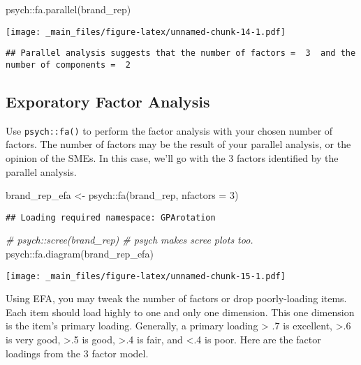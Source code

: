 \documentclass[
]{book}
\newenvironment{Shaded}{\begin{snugshade}}{\end{snugshade}}
\newcommand{\AttributeTok}[1]{\textcolor[rgb]{0.77,0.63,0.00}{#1}}
\newcommand{\CommentTok}[1]{\textcolor[rgb]{0.56,0.35,0.01}{\textit{#1}}}
\newcommand{\DecValTok}[1]{\textcolor[rgb]{0.00,0.00,0.81}{#1}}
\newcommand{\FunctionTok}[1]{\textcolor[rgb]{0.00,0.00,0.00}{#1}}
\newcommand{\NormalTok}[1]{#1}
\newcommand{\OtherTok}[1]{\textcolor[rgb]{0.56,0.35,0.01}{#1}}
\newcommand{\SpecialCharTok}[1]{\textcolor[rgb]{0.00,0.00,0.00}{#1}}
\theoremstyle{definition}
\theoremstyle{definition}
\theoremstyle{definition}
\theoremstyle{definition}
\theoremstyle{remark}
\begin{document}
\begin{Shaded}
\begin{Highlighting}[]
\NormalTok{psych}\SpecialCharTok{::}\FunctionTok{fa.parallel}\NormalTok{(brand\_rep)}
\end{Highlighting}
\end{Shaded}

\texttt{[image: \_main\_files/figure-latex/unnamed-chunk-14-1.pdf]}

\begin{verbatim}
## Parallel analysis suggests that the number of factors =  3  and the number of components =  2
\end{verbatim}

\hypertarget{exporatory-factor-analysis}{%
\subsection{Exporatory Factor Analysis}\label{exporatory-factor-analysis}}

Use \texttt{psych::fa()} to perform the factor analysis with your chosen number of factors. The number of factors may be the result of your parallel analysis, or the opinion of the SMEs. In this case, we'll go with the 3 factors identified by the parallel analysis.

\begin{Shaded}
\begin{Highlighting}[]
\NormalTok{brand\_rep\_efa }\OtherTok{\textless{}{-}}\NormalTok{ psych}\SpecialCharTok{::}\FunctionTok{fa}\NormalTok{(brand\_rep, }\AttributeTok{nfactors =} \DecValTok{3}\NormalTok{)}
\end{Highlighting}
\end{Shaded}

\begin{verbatim}
## Loading required namespace: GPArotation
\end{verbatim}

\begin{Shaded}
\begin{Highlighting}[]
\CommentTok{\# psych::scree(brand\_rep) \# psych makes scree plot\textquotesingle{}s too.}
\NormalTok{psych}\SpecialCharTok{::}\FunctionTok{fa.diagram}\NormalTok{(brand\_rep\_efa)}
\end{Highlighting}
\end{Shaded}

\texttt{[image: \_main\_files/figure-latex/unnamed-chunk-15-1.pdf]}

Using EFA, you may tweak the number of factors or drop poorly-loading items. Each item should load highly to one and only one dimension. This one dimension is the item's primary loading. Generally, a primary loading \textgreater{} .7 is excellent, \textgreater.6 is very good, \textgreater.5 is good, \textgreater.4 is fair, and \textless.4 is poor. Here are the factor loadings from the 3 factor model.
\end{document}
